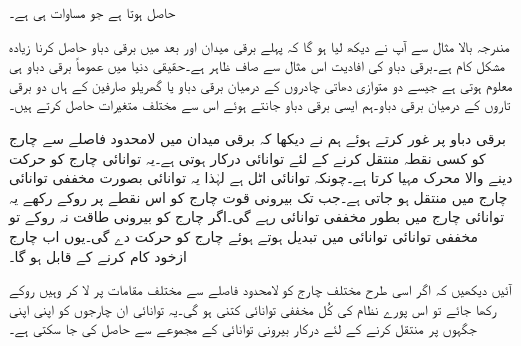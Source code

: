 حاصل ہوتا ہے جو مساوات  ہی ہے۔

مندرجہ بالا مثال سے آپ نے دیکھ لیا ہو گا کہ پہلے برقی میدان اور بعد میں برقی دباو حاصل کرنا زیادہ مشکل کام ہے۔برقی دباو کی افادیت  اس مثال سے صاف ظاہر ہے۔حقیقی دنیا میں عموماً برقی دباو ہی  معلوم ہوتی ہے جیسے دو متوازی دھاتی چادروں کے درمیان برقی دباو یا گھریلو صارفین کے ہاں دو برقی تاروں کے درمیان برقی دباو۔ہم ایسی برقی دباو جانتے ہوئے اس سے مختلف متغیرات حاصل کرتے ہیں۔ 

برقی دباو پر غور کرتے ہوئے ہم نے دیکھا کہ برقی میدان میں لامحدود فاصلے سے چارج کو کسی نقطہ منتقل کرنے کے لئے توانائی درکار ہوتی ہے۔یہ توانائی چارج کو حرکت دینے والا محرک مہیا کرتا ہے۔چونکہ توانائی اٹل ہے لہٰذا یہ توانائی بصورت مخففی توانائی چارج میں منتقل ہو جاتی ہے۔جب تک بیرونی قوت چارج کو اس نقطے پر روکے رکھے یہ توانائی چارج میں بطور مخففی توانائی رہے گی۔اگر چارج کو بیرونی طاقت نہ روکے تو مخففی توانائی  توانائی میں تبدیل ہوتے ہوئے چارج کو حرکت دے گی۔یوں اب چارج ازخود کام کرنے کے قابل ہو گا۔

آئیں دیکھیں کہ اگر اسی طرح مختلف چارج کو لامحدود فاصلے سے مختلف مقامات پر لا کر وہیں روکے رکھا جائے تو اس پورے نظام کی کُل مخففی توانائی کتنی ہو گی۔یہ توانائی ان چارجوں کو اپنی اپنی  جگہوں پر منتقل کرنے کے لئے درکار بیرونی توانائی کے مجموعے سے حاصل کی جا سکتی ہے۔

